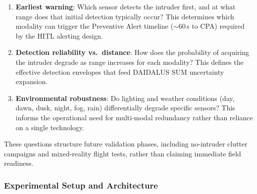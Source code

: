 \begin{enumerate}
  \item \textbf{Earliest warning}: Which sensor detects the intruder first, and at what range does that initial detection typically occur? This determines which modality can trigger the Preventive Alert timeline ($\sim$60\,s to CPA) required by the HITL alerting design.
  \item \textbf{Detection reliability vs.\ distance}: How does the probability of acquiring the intruder degrade as range increases for each modality? This defines the effective detection envelopes that feed DAIDALUS SUM uncertainty expansion.
  \item \textbf{Environmental robustness}: Do lighting and weather conditions (day, dawn, dusk, night, fog, rain) differentially degrade specific sensors? This informs the operational need for multi-modal redundancy rather than reliance on a single technology.
\end{enumerate}

These questions structure future validation phases, including no-intruder clutter campaigns and mixed-reality flight tests, rather than claiming immediate field readiness.

\subsubsection{Experimental Setup and Architecture}
\label{sec:multisensor-setup}

